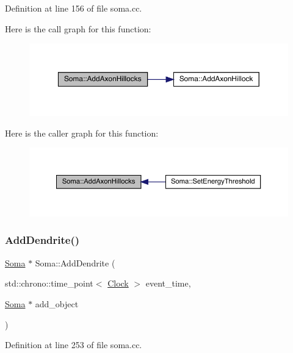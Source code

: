 Definition at line 156 of file soma.\+cc.

Here is the call graph for this function\+:
\nopagebreak
\begin{figure}[H]
\begin{center}
\leavevmode
\includegraphics[width=350pt]{class_soma_a0fbede6e06b8e24a2cf22878c2f49165_cgraph}
\end{center}
\end{figure}
Here is the caller graph for this function\+:
\nopagebreak
\begin{figure}[H]
\begin{center}
\leavevmode
\includegraphics[width=350pt]{class_soma_a0fbede6e06b8e24a2cf22878c2f49165_icgraph}
\end{center}
\end{figure}
\mbox{\label{class_soma_acc198b8ec11c3f2e43d3ba9a16ce84db}} 
\subsubsection{\texorpdfstring{Add\+Dendrite()}{AddDendrite()}}
{\footnotesize\ttfamily \hyperlink{class_soma}{Soma} $\ast$ Soma\+::\+Add\+Dendrite (\begin{DoxyParamCaption}\item[{std\+::chrono\+::time\+\_\+point$<$ \hyperlink{universe_8h_a0ef8d951d1ca5ab3cfaf7ab4c7a6fd80}{Clock} $>$}]{event\+\_\+time,  }\item[{\hyperlink{class_soma}{Soma} $\ast$}]{add\+\_\+object }\end{DoxyParamCaption})}



Definition at line 253 of file soma.\+cc.

